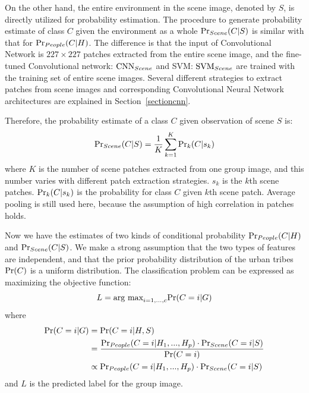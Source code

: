 \documentclass[10pt,twocolumn,letterpaper]{article}
\begin{document}
On the other hand, the entire environment in the scene image, denoted by $S$,  is directly utilized for probability estimation. The procedure to generate probability estimate of class $C$ given the environment as a whole $\textup{Pr}_{Scene}(C|S)$ is similar with that for $\textup{Pr}_{People}(C|H)$. The difference is that the input of Convolutional Network is $227\times227$ patches extracted from the entire scene image, and the fine-tuned Convolutional network: $\textup{CNN}_{Scene}$ and SVM: $\textup{SVM}_{Scene}$ are trained with the training set of entire scene images. Several different strategies to extract patches from scene images and corresponding Convolutional Neural Network architectures are explained in Section~\ref{sectioncnn}.

Therefore, the probability estimate of a class $C$ given observation of scene $S$ is:
\begin{equation}
\textup{Pr}_{Scene}(C|S)=\frac{1}{K}\sum_{k=1}^{K}\textup{Pr}_{k}(C|s_{k})
\end{equation}
where $K$ is the number of scene patches extracted from one group image, and this number varies with different patch extraction strategies. $s_{k}$ is the $k$th scene patches. $\textup{Pr}_{k}(C|s_{k})$ is the probability for class $C$ given $k$th scene patch. Average pooling is still used here, because the assumption of high correlation in patches holds. 

Now we have the estimates of two kinds of conditional probability $\textup{Pr}_{People}(C|H)$ and $\textup{Pr}_{Scene}(C|S)$. We make a strong assumption that the two types of features are independent, and that the prior probability distribution of the urban tribes $\textup{Pr}(C)$ is a uniform distribution. The classification problem can be expressed as maximizing the objective function:
\begin{equation}
L = \textup{arg max}_{i=1,...,c}\textup{Pr}(C=i|G)
\end{equation}
where
\begin{equation}
\begin{split}
 \textup{Pr}(C=i|G)& =\textup{Pr}(C=i|H, S) \\
  & = \frac{\textup{Pr}_{People}(C=i|H_{1},...,H_{p}) \cdot \textup{Pr}_{Scene}(C=i|S)}{\textup{Pr}(C=i)} \\
  & \propto \textup{Pr}_{People}(C=i|H_{1},...,H_{p}) \cdot \textup{Pr}_{Scene}(C=i|S)
\end{split}
\end{equation}
and $L$ is the predicted label for the group image. 
\end{document}
